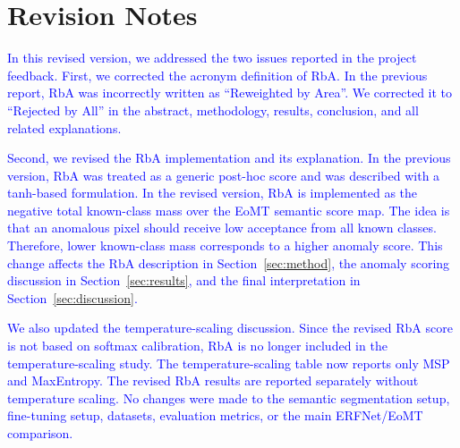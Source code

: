 
\section*{Revision Notes}

\textcolor{blue}{In this revised version, we addressed the two issues reported in the project feedback. First, we corrected the acronym definition of RbA. In the previous report, RbA was incorrectly written as ``Reweighted by Area''. We corrected it to ``Rejected by All'' in the abstract, methodology, results, conclusion, and all related explanations.}

\textcolor{blue}{Second, we revised the RbA implementation and its explanation. In the previous version, RbA was treated as a generic post-hoc score and was described with a tanh-based formulation. In the revised version, RbA is implemented as the negative total known-class mass over the EoMT semantic score map. The idea is that an anomalous pixel should receive low acceptance from all known classes. Therefore, lower known-class mass corresponds to a higher anomaly score. This change affects the RbA description in Section~\ref{sec:method}, the anomaly scoring discussion in Section~\ref{sec:results}, and the final interpretation in Section~\ref{sec:discussion}.}

\textcolor{blue}{We also updated the temperature-scaling discussion. Since the revised RbA score is not based on softmax calibration, RbA is no longer included in the temperature-scaling study. The temperature-scaling table now reports only MSP and MaxEntropy. The revised RbA results are reported separately without temperature scaling. No changes were made to the semantic segmentation setup, fine-tuning setup, datasets, evaluation metrics, or the main ERFNet/EoMT comparison.}

